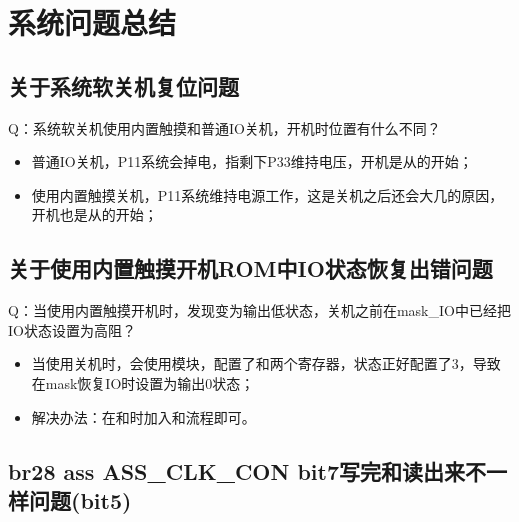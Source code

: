 \section{系统问题总结}
\subsection{关于系统软关机复位问题}
Q：系统软关机使用内置触摸和普通IO关机，开机时位置有什么不同？
\begin{itemize}
    \item 普通IO关机，P11系统会掉电，指剩下P33维持电压，开机是从的开始；
    \item 使用内置触摸关机，P11系统维持电源工作，这是关机之后还会大几的原因，开机也是从的开始；
\end{itemize}

\subsection{关于使用内置触摸开机ROM中IO状态恢复出错问题}
Q：当使用内置触摸开机时，发现变为输出低状态，关机之前在mask\_IO中已经把IO状态设置为高阻？
\begin{itemize}
    \item 当使用关机时，会使用模块，配置了和两个寄存器，状态正好配置了3，导致在mask恢复IO时设置为输出0状态；
    \item 解决办法：在和时加入和流程即可。
\end{itemize}

\subsection{br28 ass ASS\_CLK\_CON bit7写完和读出来不一样问题(bit5)}
